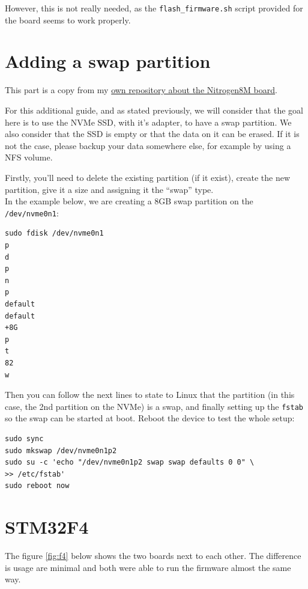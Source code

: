 \documentclass[10pt]{article}
\begin{document}
However, this is not really needed, as the \verb|flash_firmware.sh| script provided for the board seems to work properly.

\pagebreak
\section{Adding a swap partition}
\label{appendix:adding-swap-part}
This part is a copy from my \href{https://gitlab.com/nitrogen8m/documentation/}{own repository about the Nitrogen8M board}.

For this additional guide, and as stated previously, we will consider that the goal here is to use the NVMe SSD, with it's adapter, to have a swap partition. We also consider that the SSD is empty or that the data on it can be erased. If it is not the case, please backup your data somewhere else, for example by using a NFS volume.

Firstly, you'll need to delete the existing partition (if it exist), create the new partition, give it a size and assigning it the ``swap'' type.\\
In the example below, we are creating a 8GB swap partition on the \verb|/dev/nvme0n1|:
\begin{tcolorbox}
\begin{verbatim}
sudo fdisk /dev/nvme0n1
p
d
p
n
p
default
default
+8G
p
t
82
w
\end{verbatim}
\end{tcolorbox}

Then you can follow the next lines to state to Linux that the partition (in this case, the 2nd partition on the NVMe) is a swap, and finally setting up the \verb|fstab| so the swap can be started at boot. Reboot the device to test the whole setup:
\begin{tcolorbox}
\begin{verbatim}
sudo sync
sudo mkswap /dev/nvme0n1p2
sudo su -c 'echo "/dev/nvme0n1p2 swap swap defaults 0 0" \
>> /etc/fstab'
sudo reboot now
\end{verbatim}
\end{tcolorbox}

\pagebreak

\section{STM32F4}
\label{appendix:stm32f4}
The figure \ref{fig:f4} below shows the two boards next to each other. The difference is usage are minimal and both were able to run the firmware almost the same way.
\end{document}
